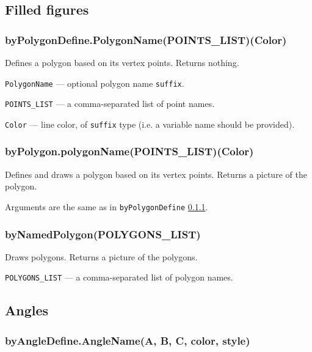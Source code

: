 \documentclass{ltxdoc}
\begin{document}
\subsection{Filled figures}


\subsubsection{byPolygonDefine.PolygonName(POINTS\_LIST)(Color)}\label{byPolygonDefine}

	Defines a polygon based on its vertex points. Returns nothing.
	
	\texttt{PolygonName} — optional polygon name \texttt{suffix}.
	
	\texttt{POINTS\_LIST} — a comma-separated list of point names.
	
	\texttt{Color} — line color, of \texttt{suffix} type (i.e. a variable name should be provided).


\subsubsection{byPolygon.polygonName(POINTS\_LIST)(Color)}\label{byPolygon}

	Defines and draws a polygon based on its vertex points. Returns a picture of the polygon.
	
	Arguments are the same as in \texttt{byPolygonDefine} \ref{byPolygonDefine}.



\subsubsection{byNamedPolygon(POLYGONS\_LIST)}\label{byNamedPolygon}
	
	Draws polygons. Returns a picture of the polygons.
	
	\texttt{POLYGONS\_LIST} — a comma-separated list of polygon names.


\subsection{Angles}

\subsubsection{byAngleDefine.AngleName(A, B, C, color, style)}\label{byAngleDefine}
	
\end{document}
